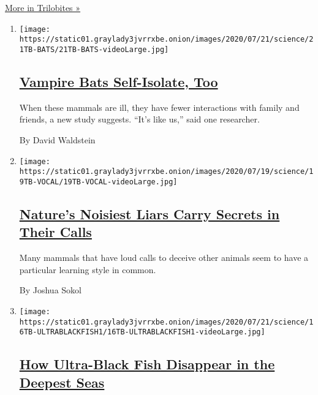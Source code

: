 \href{/column/trilobites}{More in Trilobites »}

\begin{enumerate}
\def\labelenumi{\arabic{enumi}.}
\item
  \texttt{[image: https://static01.graylady3jvrrxbe.onion/images/2020/07/21/science/21TB-BATS/21TB-BATS-videoLarge.jpg]}

  \hypertarget{vampire-bats-self-isolate-too}{%
  \subsection{\texorpdfstring{\href{/2020/07/22/science/vampire-bats-viruses.html}{Vampire
  Bats Self-Isolate,
  Too}}{Vampire Bats Self-Isolate, Too}}\label{vampire-bats-self-isolate-too}}

  When these mammals are ill, they have fewer interactions with family
  and friends, a new study suggests. ``It's like us,'' said one
  researcher.

  By David Waldstein
\item
  \texttt{[image: https://static01.graylady3jvrrxbe.onion/images/2020/07/19/science/19TB-VOCAL/19TB-VOCAL-videoLarge.jpg]}

  \hypertarget{natures-noisiest-liars-carry-secrets-in-their-calls}{%
  \subsection{\texorpdfstring{\href{/2020/07/21/science/mammals-vocal-learning.html}{Nature's
  Noisiest Liars Carry Secrets in Their
  Calls}}{Nature's Noisiest Liars Carry Secrets in Their Calls}}\label{natures-noisiest-liars-carry-secrets-in-their-calls}}

  Many mammals that have loud calls to deceive other animals seem to
  have a particular learning style in common.

  By Joshua Sokol
\item
  \texttt{[image: https://static01.graylady3jvrrxbe.onion/images/2020/07/21/science/16TB-ULTRABLACKFISH1/16TB-ULTRABLACKFISH1-videoLarge.jpg]}

  \hypertarget{how-ultra-black-fish-disappear-in-the-deepest-seas}{%
  \subsection{\texorpdfstring{\href{/2020/07/16/science/ultra-black-fish.html}{How
  Ultra-Black Fish Disappear in the Deepest
  Seas}}{How Ultra-Black Fish Disappear in the Deepest Seas}}\label{how-ultra-black-fish-disappear-in-the-deepest-seas}}


\end{enumerate}

